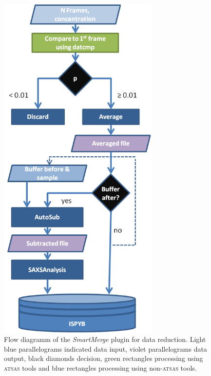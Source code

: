 \documentclass[preprint,pdf]{iucr}              %
\begin{document}
\begin{figure}
\centering
\includegraphics[width=8cm]{smartmerge.png}%
\caption{Flow diagramm of the \textit{SmartMerge} plugin for data reduction. Light blue parallelograms indicated data input, violet  parallelograms data output, black diamonds decision, green rectangles processing using \textsc{atsas} tools and blue rectangles processing using non-\textsc{atsas} tools. }
\label{fgr:smart}
\end{figure}
\end{document}
